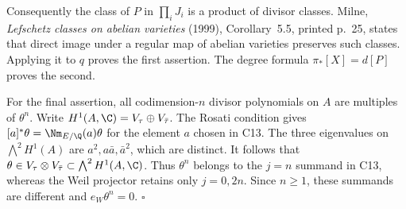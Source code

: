 Consequently the class of $P$ in $\prod_iJ_i$ is a product of divisor
classes. Milne, \emph{Lefschetz classes on abelian varieties} (1999),
Corollary~5.5, printed p.~25, states that direct image under a regular
map of abelian varieties preserves such classes. Applying it to $q$
proves the first assertion. The degree formula
$\pi_*[X]=d[P]$ proves the second.

For the final assertion, all codimension-$n$ divisor polynomials on
$A$ are multiples of $\theta^n$. Write
$H^1(A,\C)=V_\tau\oplus V_{\bar\tau}$. The Rosati condition gives
$[a]^*\theta=\Nm_{E/\Q}(a)\theta$ for the element $a$ chosen in C13.
The three eigenvalues on $\bigwedge^2H^1(A)$ are
$a^2,a\bar a,\bar a^2$, which are distinct. It follows that
$\theta\in V_\tau\otimes V_{\bar\tau}\subset\bigwedge^2H^1(A,\C)$.
Thus $\theta^n$ belongs to the $j=n$ summand in C13, whereas the
Weil projector retains only $j=0,2n$. Since $n\ge1$, these summands
are different and $e_W\theta^n=0$. $\square$


